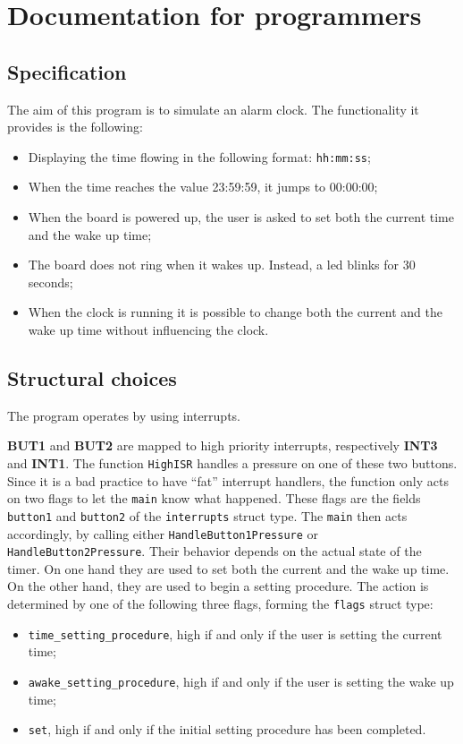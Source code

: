\section{Documentation for programmers}
\subsection{Specification}
The aim of this program is to simulate an alarm clock. The functionality it provides is the following:
\begin{itemize}
	\item Displaying the time flowing in the following format: \texttt{hh:mm:ss};
	\item When the time reaches the value 23:59:59, it jumps to 00:00:00;
	\item When the board is powered up, the user is asked to set both the current time and the wake up time;
	\item The board does not ring when it wakes up. Instead, a led blinks for 30 seconds;
	\item When the clock is running it is possible to change both the current and the wake up time without influencing the clock.
\end{itemize}

\subsection{Structural choices}
The program operates by using interrupts.

\textbf{BUT1} and \textbf{BUT2} are mapped to high priority interrupts, respectively \textbf{INT3} and \textbf{INT1}. The function \texttt{HighISR} handles a pressure on one of these two buttons. Since it is a bad practice to have ``fat'' interrupt handlers, the function only acts on two flags to let the \texttt{main} know what happened. These flags are the fields \texttt{button1} and \texttt{button2} of the \texttt{interrupts} struct type. The \texttt{main} then acts accordingly, by calling either \texttt{HandleButton1Pressure} or \\\texttt{HandleButton2Pressure}. Their behavior depends on the actual state of the timer. On one hand they are used to set both the current and the wake up time. On the other hand, they are used to begin a setting procedure. The action is determined by one of the following three flags, forming the \texttt{flags} struct type:
\begin{itemize}
	\item \texttt{time\_setting\_procedure}, high if and only if the user is setting the current time;
	\item \texttt{awake\_setting\_procedure}, high if and only if the user is setting the wake up time;
	\item \texttt{set}, high if and only if the initial setting procedure has been completed.
\end{itemize}

